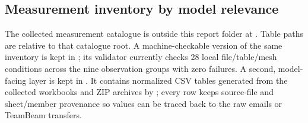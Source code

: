 \subsection{Measurement inventory by model relevance}

The collected measurement catalogue is outside this report folder at
.  Table paths are relative to that
catalogue root.  A machine-checkable version of the same inventory is kept in
; its validator currently checks
28 local file/table/mesh conditions across the nine observation groups with zero
failures.  A second, model-facing layer is kept in
.  It contains normalized CSV tables
generated from the collected workbooks and ZIP archives by
; every row keeps
source-file and sheet/member provenance so values can be traced back to the raw
emails or TeamBeam transfers.

